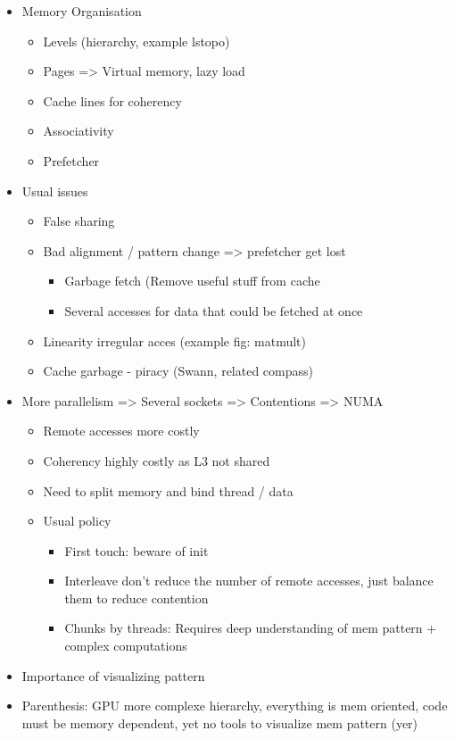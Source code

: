 \begin{itemize}
    \item Memory Organisation
        \begin{itemize}
            \item Levels (hierarchy, example lstopo)
            \item Pages => Virtual memory, lazy load
            \item Cache lines for coherency
            \item Associativity
            \item Prefetcher
        \end{itemize}
    \item Usual issues
        \begin{itemize}
            \item False sharing
            \item Bad alignment / pattern change => prefetcher get lost
                \begin{itemize}
                    \item Garbage fetch (Remove useful stuff from cache
                    \item Several accesses for data that could be fetched at once
                \end{itemize}
            \item Linearity irregular acces (example fig: matmult)
            \item Cache garbage - piracy (Swann, related compass)
        \end{itemize}
    \item More parallelism => Several sockets => Contentions => \gls{NUMA}
        \begin{itemize}
            \item Remote accesses more costly
            \item Coherency highly costly as L3 not shared
            \item Need to split memory and bind thread / data
            \item Usual policy
                \begin{itemize}
                    \item First touch: beware of init
                    \item Interleave don't reduce the number of remote accesses, just balance them to reduce contention
                    \item Chunks by threads: Requires deep understanding of mem pattern + complex computations
                \end{itemize}
        \end{itemize}
    \item Importance of visualizing pattern
    \item Parenthesis: \gls{GPU} more complexe hierarchy, everything is mem oriented, code must be memory dependent, yet no tools to visualize mem pattern (yer)
\end{itemize}

